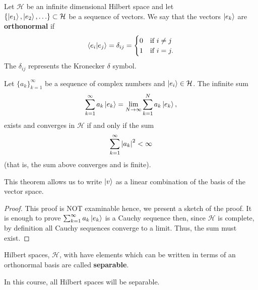 \documentclass[12pt, a4paper]{article}
\begin{document}
\begin{definition}
    Let \(\mathcal{H}\) be an infinite dimensional Hilbert space and let \\ \(\{\ket{e_1},\ket{e_2}, \ldots\} \subset \mathcal{H}\) be a sequence of vectors. We say that the vectors \(\ket{e_k}\) are \textbf{orthonormal} if 
    \[\begin{aligned}
        \bra{e_i} \ket{e_j} = \delta_{ij} = \begin{cases}
            0 &\text{if } i\neq j \\
            1 &\text{if } i=j.
        \end{cases}
    \end{aligned}\]
    The \(\delta_{ij}\) represents the Kronecker \(\delta\) symbol.
\end{definition}

\begin{theorem}
    Let \(\{a_k\}_{k=1}^{\infty}\) be a sequence of complex numbers and \(\ket{e_i} \in \mathcal{H}\). The infinite sum 
    \[\sum_{k=1}^{\infty} a_k \ket{e_k} = \lim_{N \to \infty} \sum_{k=1}^{N} a_k \ket{e_k},\]
    exists and converges in \(\mathcal{H}\) if and only if the sum
    \[\sum_{k=1}^{\infty} \abs{a_k}^2 <\infty\]
    (that is, the sum above converges and is finite).
\end{theorem}

\begin{mdnote}
    This theorem allows us to write \(\ket{v}\) as a linear combination of the basis of the vector space.
\end{mdnote}

\begin{proof}
    This proof is NOT examinable hence, we present a sketch of the proof. It is enough to prove \(\sum_{k=1}^{\infty} a_k \ket{e_k}\) is a Cauchy sequence then, since \(\mathcal{H}\) is complete, by definition all Cauchy sequences converge to a limit. Thus, the sum must exist.
\end{proof}

\begin{definition}
    Hilbert spaces, \(\mathcal{H}\), with have elements which can be written in terms of an orthonormal basis are called \textbf{separable}.
\end{definition}

\begin{mdremark}
    In this course, all Hilbert spaces will be separable.
\end{mdremark}
\end{document}
